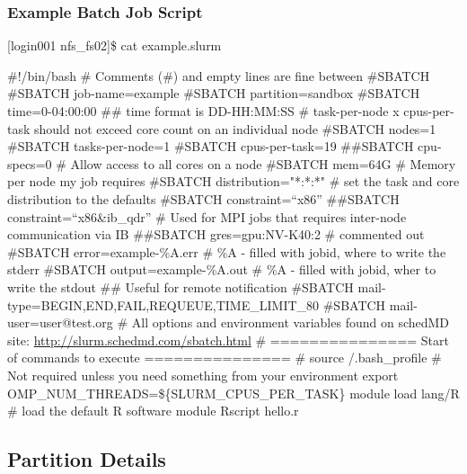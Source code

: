 \begin{frame}[fragile]
\frametitle{Example Batch Job Script}
\begin{semiverbatim}\tiny
[login001 nfs_fs02]\$ cat example.slurm

\#!/bin/bash
\# Comments (\#) and empty lines are fine between \#SBATCH
\#SBATCH \ddash{}job-name=example
\#SBATCH \ddash{}partition=sandbox
\#SBATCH \ddash{}time=0-04:00:00 ## time format is DD-HH:MM:SS
\# task-per-node x cpus-per-task should not exceed core count on an individual node 
\#SBATCH \ddash{}nodes=1
\#SBATCH \ddash{}tasks-per-node=1
\#SBATCH \ddash{}cpus-per-task=19
\#\#SBATCH \ddash{}cpu-specs=0 # Allow access to all cores on a node
\#SBATCH \ddash{}mem=64G \# Memory per node my job requires
\#SBATCH \ddash{}distribution="*:*:*" \# set the task and core distribution to the defaults
\#SBATCH \ddash{}constraint=``x86''
\#\#SBATCH \ddash{}constraint=``x86\&ib_qdr'' \# Used for MPI jobs that requires inter-node communication via IB
\#\#SBATCH \ddash{}gres=gpu:NV-K40:2 \# commented out
\#SBATCH \ddash{}error=example-\%A.err \# \%A - filled with jobid, where to write the stderr
\#SBATCH \ddash{}output=example-\%A.out \# \%A - filled with jobid, wher to write the stdout
\#\# Useful for remote notification
\#SBATCH \ddash{}mail-type=BEGIN,END,FAIL,REQUEUE,TIME\_LIMIT\_80
\#SBATCH \ddash{}mail-user=user@test.org
\# All options and environment variables found on schedMD site: \href{http://slurm.schedmd.com/sbatch.html}{http://slurm.schedmd.com/sbatch.html}
\# =============== Start of commands to execute ===============
\# source \ctilde/.bash_profile \# Not required unless you need something from your environment
export OMP\_NUM\_THREADS=\$\{SLURM\_CPUS\_PER\_TASK\}
module load lang/R  \# load the default R software module
Rscript hello.r
\end{semiverbatim}
\end{frame}




\subsection{Partition Details}

